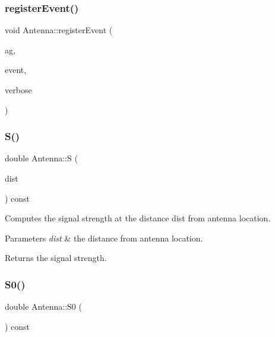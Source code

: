 \subsubsection{\texorpdfstring{register\+Event()}{registerEvent()}}
{\footnotesize\ttfamily void Antenna\+::register\+Event (\begin{DoxyParamCaption}\item[{\hyperlink{class_holdable_agent}{Holdable\+Agent} $\ast$}]{ag,  }\item[{const \hyperlink{_event_type_8h_a2628ea8d12e8b2563c32f05dc7fff6fa}{Event\+Type}}]{event,  }\item[{const bool}]{verbose }\end{DoxyParamCaption})\hspace{0.3cm}{\ttfamily [private]}}

\mbox{\label{class_antenna_a5715c4100035c58d63b7c9a0195748fe}} 
\subsubsection{\texorpdfstring{S()}{S()}}
{\footnotesize\ttfamily double Antenna\+::S (\begin{DoxyParamCaption}\item[{double}]{dist }\end{DoxyParamCaption}) const}

Computes the signal strength at the distance dist from antenna location. 
\begin{DoxyParams}{Parameters}
{\em dist} & the distance from antenna location. \\
\hline
\end{DoxyParams}
\begin{DoxyReturn}{Returns}
the signal strength. 
\end{DoxyReturn}
\mbox{\label{class_antenna_a033246c50bec80123860154a949620c7}} 
\subsubsection{\texorpdfstring{S0()}{S0()}}
{\footnotesize\ttfamily double Antenna\+::\+S0 (\begin{DoxyParamCaption}{ }\end{DoxyParamCaption}) const\hspace{0.3cm}{\ttfamily [private]}}


